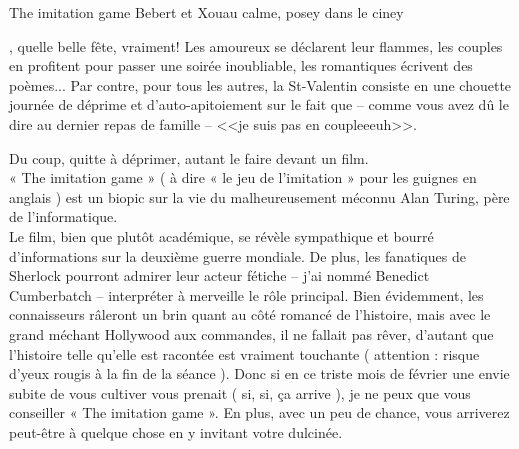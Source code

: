 \newpage
{}

\vspace*{-1.9cm}\begin{article}
{The imitation game }
{Bebert et Xou}{au calme, posey dans le ciney}

\begin{spacing}{.9}
, quelle belle fête, vraiment! Les amoureux se déclarent leur flammes, les couples en profitent pour passer une soirée inoubliable, les romantiques écrivent des poèmes... Par contre, pour tous les autres, la St-Valentin consiste en une chouette journée de déprime et d'auto-apitoiement  sur le fait que – comme vous avez dû le dire au dernier repas de famille – <<je suis pas en coupleeeuh>>. 

Du coup, quitte à déprimer, autant le faire devant un film.\\
« The imitation game » ( à dire « le jeu de l'imitation » pour les guignes en anglais ) est un biopic sur la vie du malheureusement méconnu Alan Turing, père de l'informatique.\\
Le film, bien que plutôt académique, se révèle sympathique et bourré d'informations sur la deuxième guerre mondiale. De plus, les fanatiques de Sherlock pourront admirer leur acteur fétiche – j'ai nommé Benedict Cumberbatch – interpréter à merveille le rôle principal. Bien évidemment, les connaisseurs râleront un brin quant au côté romancé de l'histoire, mais avec le grand méchant  Hollywood aux commandes, il ne fallait pas rêver, d'autant que l'histoire telle qu'elle est racontée est vraiment touchante ( attention : risque d'yeux rougis à la fin de la séance ). Donc si en ce triste mois de février une envie subite de vous cultiver vous prenait ( si, si, ça arrive ), je ne peux que vous conseiller « The imitation game ». En plus, avec un peu de chance, vous arriverez peut-être à quelque chose en y invitant votre dulcinée.
\end{spacing}
\end{article}

\vspace*{-5mm}
\begin{center}
{\hspace*{2mm}
{\fontsize{1cm}{1em}\selectfont{\Fontlukas Dossier Saint-Valentin}}}
\hspace*{2mm}
\end{center}
\vspace*{-3mm}

